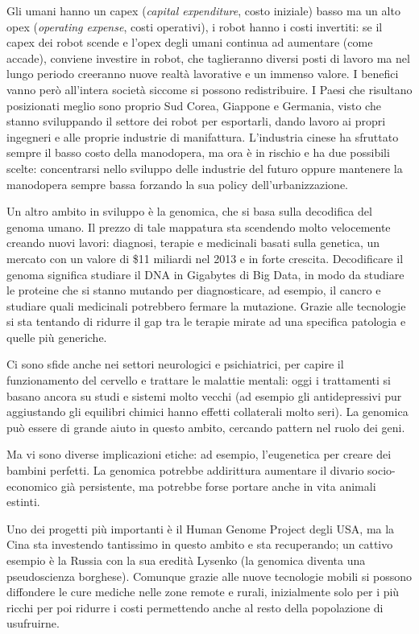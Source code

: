 \documentclass[a4page, 11pt]{article}
\begin{document}
Gli umani hanno un capex (\textit{capital expenditure}, costo iniziale) basso ma un alto opex (\textit{operating expense}, costi operativi), i robot hanno i costi invertiti: se il capex dei robot scende e l'opex degli umani continua ad aumentare (come accade), conviene investire in robot, che taglieranno diversi posti di lavoro ma nel lungo periodo creeranno nuove realtà lavorative e un immenso valore.
I benefici vanno però all'intera società siccome si possono redistribuire.
I Paesi che risultano posizionati meglio sono proprio Sud Corea, Giappone e Germania, visto che stanno sviluppando il settore dei robot per esportarli, dando lavoro ai propri ingegneri e alle proprie industrie di manifattura.
L'industria cinese ha sfruttato sempre il basso costo della manodopera, ma ora è in rischio e ha due possibili scelte: concentrarsi nello sviluppo delle industrie del futuro oppure mantenere la manodopera sempre bassa forzando la sua policy dell'urbanizzazione.

Un altro ambito in sviluppo è la genomica, che si basa sulla decodifica del genoma umano.
Il prezzo di tale mappatura sta scendendo molto velocemente creando nuovi lavori: diagnosi, terapie e medicinali basati sulla genetica, un mercato con un valore di \$11 miliardi nel 2013 e in forte crescita.
Decodificare il genoma significa studiare il DNA in Gigabytes di Big Data, in modo da studiare le proteine che si stanno mutando per diagnosticare, ad esempio, il cancro e studiare quali medicinali potrebbero fermare la mutazione.
Grazie alle tecnologie si sta tentando di ridurre il gap tra le terapie mirate ad una specifica patologia e quelle più generiche.

Ci sono sfide anche nei settori neurologici e psichiatrici, per capire il funzionamento del cervello e trattare le malattie mentali: oggi i trattamenti si basano ancora su studi e sistemi molto vecchi (ad esempio gli antidepressivi pur aggiustando gli equilibri chimici hanno effetti collaterali molto seri).
La genomica può essere di grande aiuto in questo ambito, cercando pattern nel ruolo dei geni.

Ma vi sono diverse implicazioni etiche: ad esempio, l'eugenetica per creare dei bambini perfetti.
La genomica potrebbe addirittura aumentare il divario socio-economico già persistente, ma potrebbe forse portare anche in vita animali estinti.

Uno dei progetti più importanti è il Human Genome Project degli USA, ma la Cina sta investendo tantissimo in questo ambito e sta recuperando; un cattivo esempio è la Russia con la sua eredità Lysenko (la genomica diventa una pseudoscienza borghese).
Comunque grazie alle nuove tecnologie mobili si possono diffondere le cure mediche nelle zone remote e rurali, inizialmente solo per i più ricchi per poi ridurre i costi permettendo anche al resto della popolazione di usufruirne.
\end{document}
